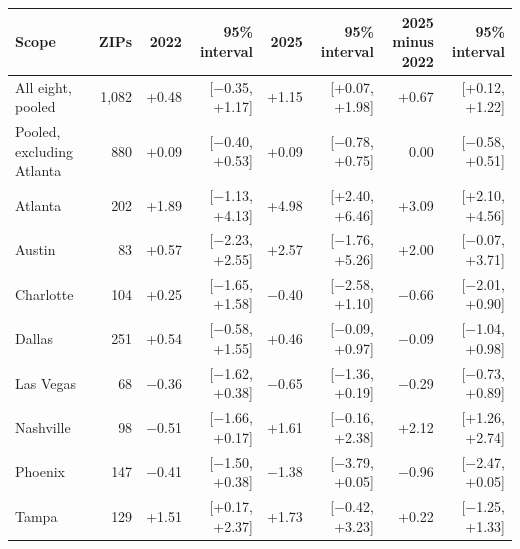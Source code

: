 \footnotesize\setlength{\tabcolsep}{2.2pt}
\begin{tabular}{lrrrrrrr}
\toprule
Scope & ZIPs & 2022 & 95\% interval & 2025 & 95\% interval & \shortstack[r]{2025 minus\\2022} & 95\% interval \\
\midrule
All eight, pooled & 1,082 & +0.48 & [$-$0.35, +1.17] & +1.15 & [+0.07, +1.98] & +0.67 & [+0.12, +1.22] \\
Pooled, excluding Atlanta & 880 & +0.09 & [$-$0.40, +0.53] & +0.09 & [$-$0.78, +0.75] & 0.00 & [$-$0.58, +0.51] \\
Atlanta & 202 & +1.89 & [$-$1.13, +4.13] & +4.98 & [+2.40, +6.46] & +3.09 & [+2.10, +4.56] \\
Austin & 83 & +0.57 & [$-$2.23, +2.55] & +2.57 & [$-$1.76, +5.26] & +2.00 & [$-$0.07, +3.71] \\
Charlotte & 104 & +0.25 & [$-$1.65, +1.58] & $-$0.40 & [$-$2.58, +1.10] & $-$0.66 & [$-$2.01, +0.90] \\
Dallas & 251 & +0.54 & [$-$0.58, +1.55] & +0.46 & [$-$0.09, +0.97] & $-$0.09 & [$-$1.04, +0.98] \\
Las Vegas & 68 & $-$0.36 & [$-$1.62, +0.38] & $-$0.65 & [$-$1.36, +0.19] & $-$0.29 & [$-$0.73, +0.89] \\
Nashville & 98 & $-$0.51 & [$-$1.66, +0.17] & +1.61 & [$-$0.16, +2.38] & +2.12 & [+1.26, +2.74] \\
Phoenix & 147 & $-$0.41 & [$-$1.50, +0.38] & $-$1.38 & [$-$3.79, +0.05] & $-$0.96 & [$-$2.47, +0.05] \\
Tampa & 129 & +1.51 & [+0.17, +2.37] & +1.73 & [$-$0.42, +3.23] & +0.22 & [$-$1.25, +1.33] \\
\bottomrule
\end{tabular}
